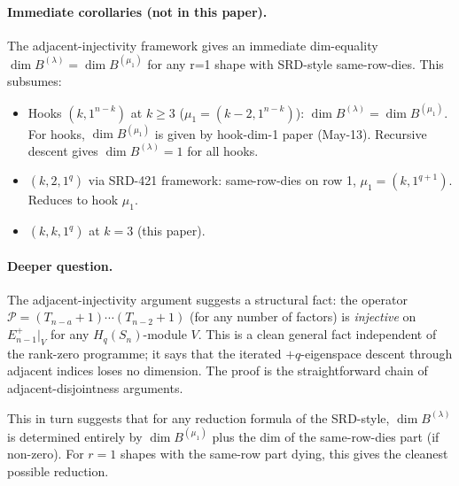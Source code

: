 \documentclass[11pt]{article}
\theoremstyle{definition}
\begin{document}
\paragraph{Immediate corollaries (not in this paper).}
The adjacent-injectivity framework gives an immediate dim-equality
$\dim B^{(\lambda)} = \dim B^{(\mu_1)}$ for any r=1 shape with
SRD-style same-row-dies. This subsumes:
\begin{itemize}[leftmargin=2em,topsep=0.2em,itemsep=0.1em]
\item Hooks $(k, 1^{n-k})$ at $k \ge 3$ ($\mu_1 = (k-2, 1^{n-k})$):
$\dim B^{(\lambda)} = \dim B^{(\mu_1)}$. For hooks, $\dim B^{(\mu_1)}$
is given by hook-dim-1 paper (May-13). Recursive descent gives
$\dim B^{(\lambda)} = 1$ for all hooks.
\item $(k, 2, 1^q)$ via SRD-421 framework: same-row-dies on row 1,
$\mu_1 = (k, 1^{q+1})$. Reduces to hook $\mu_1$.
\item $(k, k, 1^q)$ at $k = 3$ (this paper).
\end{itemize}

\paragraph{Deeper question.}
The adjacent-injectivity argument suggests a structural fact: the
operator $\mathcal{P} = (T_{n-a}+1)\cdots(T_{n-2}+1)$ (for any number
of factors) is \emph{injective} on $E_{n-1}^+|_V$ for any
$H_q(S_n)$-module $V$. This is a clean general fact independent of
the rank-zero programme; it says that the iterated $+q$-eigenspace
descent through adjacent indices loses no dimension. The proof is the
straightforward chain of adjacent-disjointness arguments.

This in turn suggests that for any reduction formula of the SRD-style,
$\dim B^{(\lambda)}$ is determined entirely by $\dim B^{(\mu_1)}$
plus the dim of the same-row-dies part (if non-zero). For
$r = 1$ shapes with the same-row part dying, this gives the cleanest
possible reduction.
\end{document}
